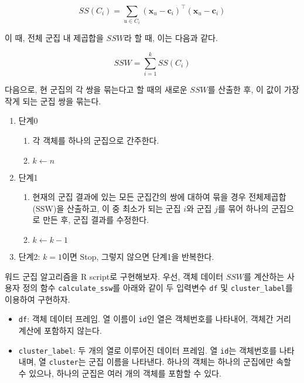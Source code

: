 \documentclass[
]{book}
\providecommand{\tightlist}{%
  \setlength{\itemsep}{0pt}\setlength{\parskip}{0pt}}
\begin{document}
\begin{equation*}
SS(C_i) = \sum_{u \in C_i} \left(\mathbf{x}_u - \mathbf{c}_i\right)^\top\left(\mathbf{x}_u - \mathbf{c}_i\right)
\end{equation*}

이 때, 전체 군집 내 제곱합을 \(SSW\)라 할 때, 이는 다음과 같다.

\begin{equation*}
SSW = \sum_{i = 1}^{k} SS(C_i)
\end{equation*}

다음으로, 현 군집의 각 쌍을 묶는다고 할 때의 새로운 \(SSW\)를 산출한 후, 이 값이 가장 작게 되는 군집 쌍을 묶는다.

\begin{enumerate}
\def\labelenumi{\arabic{enumi}.}
\tightlist
\item
  단계0

  \begin{enumerate}
  \def\labelenumii{\arabic{enumii}.}
  \tightlist
  \item
    각 객체를 하나의 군집으로 간주한다.
  \item
    \(k \leftarrow n\)
  \end{enumerate}
\item
  단계1

  \begin{enumerate}
  \def\labelenumii{\arabic{enumii}.}
  \tightlist
  \item
    현재의 군집 결과에 있는 모든 군집간의 쌍에 대하여 묶을 경우 전체제곱합(SSW)을 산출하고, 이 중 최소가 되는 군집 \(i\)와 군집 \(j\)를 묶어 하나의 군집으로 만든 후, 군집 결과를 수정한다.
  \item
    \(k \leftarrow k - 1\)
  \end{enumerate}
\item
  단계2: \(k = 1\)이면 Stop, 그렇지 않으면 단계1을 반복한다.
\end{enumerate}

워드 군집 알고리즘을 R script로 구현해보자. 우선, 객체 데이터 \(SSW\)를 계산하는 사용자 정의 함수 \texttt{calculate\_ssw}를 아래와 같이 두 입력변수 \texttt{df} 및 \texttt{cluster\_label}를 이용하여 구현하자.

\begin{itemize}
\tightlist
\item
  \texttt{df}: 객체 데이터 프레임. 열 이름이 \texttt{id}인 열은 객체번호를 나타내어, 객체간 거리 계산에 포함하지 않는다.
\item
  \texttt{cluster\_label}: 두 개의 열로 이루어진 데이터 프레임. 열 \texttt{id}는 객체번호를 나타내며, 열 \texttt{cluster}는 군집 이름을 나타낸다. 하나의 객체는 하나의 군집에만 속할 수 있으나, 하나의 군집은 여러 개의 객체를 포함할 수 있다.
\end{itemize}
\end{document}

